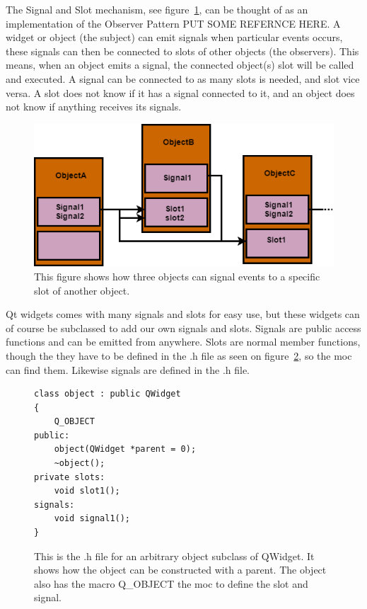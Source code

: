 The Signal and Slot mechanism, see figure~\ref{fig:SignalAndSlots}, can be thought of as an implementation of the Observer Pattern PUT SOME REFERNCE HERE. A widget or object (the subject) can emit signals when particular events occurs, these signals can then be connected to slots of other objects (the observers). This means, when an object emits a signal, the connected object(s) slot will be called and executed. A signal can be connected to as many slots is needed, and slot vice versa. A slot does not know if it has a signal connected to it, and an object does not know if anything receives its signals.   

\begin{figure}[h]
	\centering
	\includegraphics[scale=0.55]{Figures/SignalsAndSlots.png}
	\caption{This figure shows how three objects can signal events to a specific slot of another object.}
	\label{fig:SignalAndSlots}
\end{figure}

Qt widgets comes with many signals and slots for easy use, but these widgets can of course be subclassed to add our own signals and slots. Signals are public access functions and can be emitted from anywhere. Slots are normal member functions, though the they have to be defined in the .h file as seen on figure~\ref{fig:subClassQWidget}, so the moc can find them. Likewise signals are defined in the .h file.

\begin{figure}[h]
\centering
\lstset{language=C++} 
\begin{lstlisting}[frame=single] 
class object : public QWidget
{
	Q_OBJECT
public:
	object(QWidget *parent = 0);
	~object();
private slots:
	void slot1();
signals:
	void signal1();
}
\end{lstlisting}
\caption{This is the .h file for an arbitrary object subclass of QWidget. It shows how the object can be constructed with a parent. The object also has the macro Q\_OBJECT the moc to define the slot and signal.}
\label{fig:subClassQWidget} 	
\end{figure}

